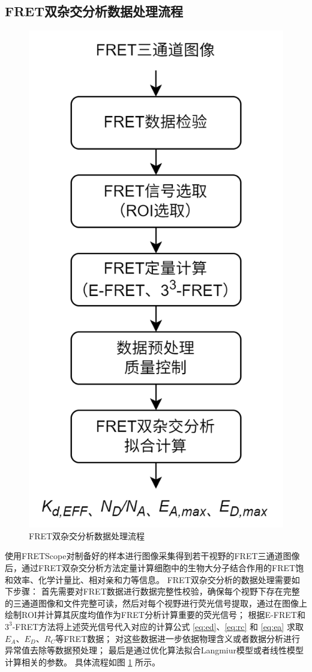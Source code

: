\subsection{FRET双杂交分析数据处理流程}
\begin{figure}[hbtp]
  \centering
  \includegraphics[width=0.4\linewidth]{../figures/2/双杂交数据处理流程.drawio.png}
  \caption{FRET双杂交分析数据处理流程}
  \label{fig:tha_data_process}
\end{figure}
使用FRETScope对制备好的样本进行图像采集得到若干视野的FRET三通道图像后，通过FRET双杂交分析方法定量计算细胞中的生物大分子结合作用的FRET饱和效率、化学计量比、相对亲和力等信息。
FRET双杂交分析的数据处理需要如下步骤：
首先需要对FRET数据进行数据完整性校验，确保每个视野下存在完整的三通道图像和文件完整可读，然后对每个视野进行荧光信号提取，通过在图像上绘制ROI并计算其灰度均值作为FRET分析计算重要的荧光信号；
根据E-FRET和$3^3$-FRET方法将上述荧光信号代入对应的计算公式 \ref{eq:ed}、\ref{eq:rc} 和 \ref{eq:ea} 求取$E_A$、$E_D$、$R_C$等FRET数据；
对这些数据进一步依据物理含义或者数据分析进行异常值去除等数据预处理；
最后是通过优化算法拟合Langmiur模型或者线性模型计算相关的参数。
具体流程如图 \ref{fig:tha_data_process} 所示。

